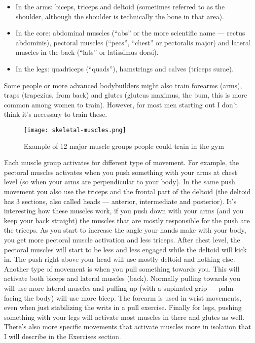 \documentclass[openany, 12pt]{book}
\begin{document}
        \begin{itemize}
          \item In the arms: biceps, triceps and deltoid (sometimes referred to as the shoulder, although the shoulder is technically the bone in that area).
          \item In the core: abdominal muscles (``abs'' or the more scientific name --- rectus abdominis), pectoral muscles (``pecs'', ``chest'' or pectoralis major) and
            lateral muscles in the back (``lats'' or latissimus dorsi).
          \item In the legs: quadriceps (``quads''), hamstrings and calves (triceps surae).
        \end{itemize}

        Some people or more advanced bodybuilders might also train forearms (arms), traps (trapezius, from back) and glutes (gluteus maximus, the bum, this is more common among women to train).
        However, for most men starting out I don't think it's necessary to train these.

	\begin{figure}[h]
		\centering
		\texttt{[image: skeletal-muscles.png]}
		\caption{Example of 12 major muscle groups people could train in the gym}
		\label{fig10}    %
	\end{figure}

        Each muscle group activates for different type of movement. For example, the pectoral muscles activates when you push something with your arms at chest level (so when your arms are
        perpendicular to your body). In the same push movement you also use the triceps and the frontal part of the deltoid (the deltoid has 3 sections, also called heads --- anterior,
        intermediate and posterior).
        It's interesting how these muscles work, if you push down with your arms
        (and you keep your back straight) the muscles that are mostly responsible for the push are the triceps. As you start to increase the angle your hands make with your body, you get more
        pectoral muscle activation and less triceps. After chest level, the pectoral muscles will start to be less and less engaged while the deltoid will kick in. The push right above your head will
        use mostly deltoid and nothing else. Another type of movement is when you pull something towards you. This will activate both biceps and lateral muscles (back). Normally pulling towards you
        will use more lateral muscles and pulling up (with a supinated grip --- palm facing the body) will use more bicep. The forearm is used in wrist movements, even when just stabilizing the writs
        in a pull exercise.
        Finally for legs, pushing something with your legs will activate most muscles in there and glutes as well. There's also more specific movements that activate muscles more in isolation that I
        will describe in the Exercises section.
\end{document}
